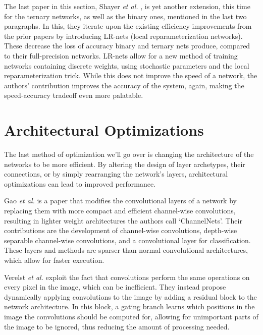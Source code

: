 \documentclass[11pt,a4paper,oldfontcommands]{memoir}
\begin{document}
The last paper in this section, Shayer \textit{et al.} \cite{Reparam}, is yet another extension, this time for the ternary networks, as well as the binary ones, mentioned in the last two paragraphs. In this, they iterate upon the existing efficiency improvements from the prior papers by introducing LR-nets (local reparameterization networks). These decrease the loss of accuracy binary and ternary nets produce, compared to their full-precision networks. LR-nets allow for a new method of training networks containing discrete weights, using stochastic parameters and the local reparameterization trick. While this does not improve the speed of a network, the authors' contribution improves the accuracy of the system, again, making the speed-accuracy tradeoff even more palatable.

\section{Architectural Optimizations}
The last method of optimization we'll go over is changing the architecture of the networks to be more efficient. By altering the design of layer archetypes, their connections, or by simply rearranging the network's layers, architectural optimizations can lead to improved performance. 

Gao \textit{et al.} \cite{ChannelNet} is a paper that modifies the convolutional layers of a network by replacing them with more compact and efficient channel-wise convolutions, resulting in lighter weight architectures the authors call `ChannelNets'. Their contributions are the development of channel-wise convolutions, depth-wise separable channel-wise convolutions, and a convolutional layer for classification. These layers and methods are sparser than normal convolutional architectures, which allow for faster execution.

Verelst \textit{et al.} \cite{DynaConv} exploit the fact that convolutions perform the same operations on every pixel in the image, which can be inefficient. They instead propose dynamically applying convolutions to the image by adding a residual block to the network architecture. In this block, a gating branch learns which positions in the image the convolutions should be computed for, allowing for unimportant parts of the image to be ignored, thus reducing the amount of processing needed. 
\end{document}
